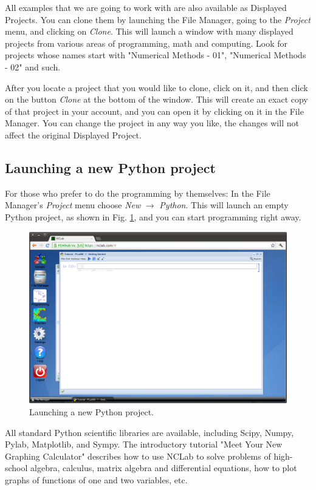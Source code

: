 \documentclass[article,A4,12pt]{llncs}
\begin{document}
All examples that we are going to work with are also available 
as Displayed Projects. You can clone them by launching the File
Manager, going to the {\em Project} menu, and clicking on {\em Clone}. This will launch 
a window with many displayed projects from various areas of programming,
math and computing. Look for projects whose names start with "Numerical Methods - 01",
"Numerical Methods - 02" and such.

After you locate a project that you would like to clone, click on it,
and then click on the button {\em Clone} at the bottom of the window. This will
create an exact copy of that project in your account, and you can open it 
by clicking on it in the File Manager. You can change the project in any way 
you like, the changes will not affect the original Displayed Project. 


\subsection{Launching a new Python project}

For those who prefer to do the programming by themselves: 
In the File Manager's {\em Project} menu 
choose {\em New} $\rightarrow$ {\em Python}. This will launch an 
empty Python project, as shown in Fig. \ref{fig:python}, and you can start 
programming right away. 

\begin{figure}[!ht]
\begin{center}
\includegraphics[width=\textwidth]{img/python.png}
\end{center}
\caption{Launching a new Python project.}
\label{fig:python}
\end{figure}
\noindent
All standard Python scientific  libraries are 
available, including Scipy, Numpy, Pylab, Matplotlib, and Sympy. 
The introductory tutorial "Meet Your New Graphing Calculator"
describes how to use NCLab to solve problems of high-school algebra,
calculus, matrix algebra and differential equations, how to 
plot graphs of functions of one and two variables, etc. 
\end{document}
